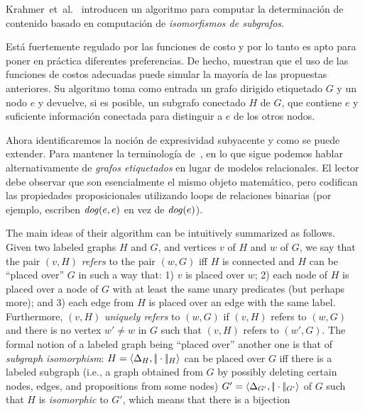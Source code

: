
Krahmer~et~al.~\cite{Krahmer2003} introducen un algoritmo para computar la determinaci\'on de
contenido basado en computaci\'on de \emph{isomorfismos de subgrafos}.

Est\'a fuertemente regulado por las funciones de costo y por lo tanto es apto para poner en pr\'actica
diferentes preferencias. De hecho, muestran que el uso de las funciones de costos adecuadas
puede simular la mayor\'ia de las propuestas anteriores. Su algoritmo toma como entrada
un grafo dirigido etiquetado $G$ y un nodo $e$ y devuelve, si es posible,
un subgrafo conectado $H$  de $G$, que contiene $e$ y suficiente informaci\'on conectada para
distinguir a $e$ de los otros nodos.

Ahora identificaremos la noci\'on de expresividad subyacente y como se puede extender.
Para mantener la terminolog\'ia de~\cite{Krahmer2003}, en lo que sigue
podemos hablar alternativamente de \emph{grafos etiquetados} en lugar de modelos relacionales.
El lector debe observar que son esencialmente el mismo objeto matem\'atico, pero codifican las propiedades proposicionales utilizando
loops de relaciones binarias (por ejemplo, escriben $\mathit{dog}(e,e)$ en vez de $\mathit{dog}(e)$).

The main ideas of their algorithm can be
intuitively summarized as follows.
Given two labeled graphs $H$ and $G$, and vertices $v$ of $H$
and $w$ of $G$, we say that the pair $(v,H)$ {\em refers}
to the pair $(w,G)$ iff $H$ is connected and $H$ can be ``placed
over'' $G$ in such a way that: 1) $v$ is placed over $w$; 2) each
node of $H$ is placed over a node of $G$ with at least the same
unary predicates (but perhaps more); and 3) each edge from $H$ is
placed over an edge with the same label. Furthermore, $(v,H)$ {\em
uniquely refers} to $(w,G)$ if $(v,H)$ refers to $(w,G)$ and there
is no vertex $w'\not=w$ in $G$ such that $(v,H)$ refers to $(w',G)$.
The formal notion of a labeled graph being ``placed over'' another
one is that of {\em subgraph isomorphism}:
$H=\langle \Delta_H,|\!|\cdot|\!|_H \rangle$ can be placed over
$G$ iff there is a labeled subgraph (i.e., a graph obtained from
$G$ by possibly deleting certain nodes, edges, and propositions from some nodes)
$G'=\langle \Delta_{G'},|\!|\cdot|\!|_{G'} \rangle$ of $G$ such that $H$ is {\em
isomorphic} to $G'$, which means that there is a
bijection


